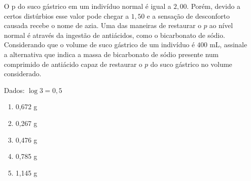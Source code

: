 O p do suco gástrico em um indivíduo normal é igual a $2,00$. Porém, devido a certos distúrbios esse valor pode chegar a $1,50$ e a sensação de desconforto causada recebe o nome de azia. Uma das maneiras de restaurar o $p$ ao nível normal é através da ingestão de antiácidos, como o bicarbonato de sódio. Considerando que o volume de suco gástrico de um indivíduo é $400$ mL, assinale a alternativa que indica a massa de bicarbonato de sódio presente num comprimido de antiácido capaz de restaurar o $p$ do suco gástrico no volume considerado. 

Dados: $\log 3 = 0,5$

\begin{enumerate}[label = (\alph*)]	
	\item 0,672 g 
	\item 0,267 g   
	\item 0,476 g      
	\item 0,785 g
	\item 1,145 g
\end{enumerate} 
